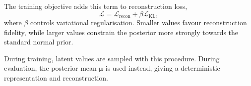 The training objective adds this term to reconstruction loss,
\[
\mathcal{L}
=
\mathcal{L}_{\mathrm{recon}}
+
\beta\mathcal{L}_{\mathrm{KL}},
\]
where $\beta$ controls variational regularisation. Smaller values favour
reconstruction fidelity, while larger values constrain the posterior more
strongly towards the standard normal prior.

During training, latent values are sampled with this procedure. During
evaluation, the posterior mean $\boldsymbol{\mu}$ is used instead,
giving a deterministic representation and reconstruction.
